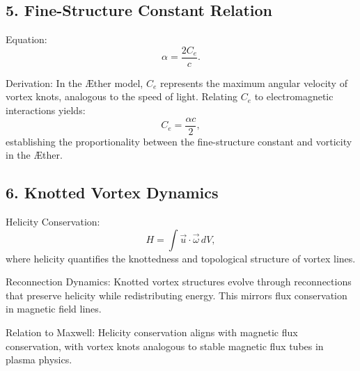         \subsection*{5. Fine-Structure Constant Relation}
        Equation:
        \begin{equation}
            \alpha = \frac{2C_e}{c}.
        \end{equation}

        Derivation:
        In the Æther model, $C_e$ represents the maximum angular velocity of vortex knots, analogous to the speed of light. Relating $C_e$ to electromagnetic interactions yields:
        \begin{equation}
            C_e = \frac{\alpha c}{2},
        \end{equation}
        establishing the proportionality between the fine-structure constant and vorticity in the Æther.

        \subsection*{6. Knotted Vortex Dynamics}
        Helicity Conservation:
        \begin{equation}
            H = \int \vec{u} \cdot \vec{\omega} \, dV,
        \end{equation}
        where helicity quantifies the knottedness and topological structure of vortex lines.

        Reconnection Dynamics:
        Knotted vortex structures evolve through reconnections that preserve helicity while redistributing energy. This mirrors flux conservation in magnetic field lines.

        Relation to Maxwell:
        Helicity conservation aligns with magnetic flux conservation, with vortex knots analogous to stable magnetic flux tubes in plasma physics.

